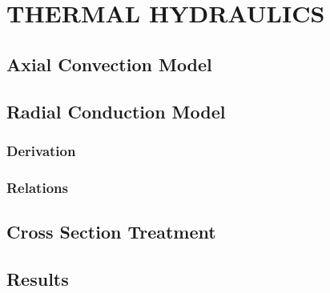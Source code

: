 \chapter{THERMAL HYDRAULICS}
\label{ch:thermalHydraulics}

\section{Axial Convection Model}
\section{Radial Conduction Model}
  \subsection{Derivation}
  \subsection{Relations}
\section{Cross Section Treatment}
\section{Results}

